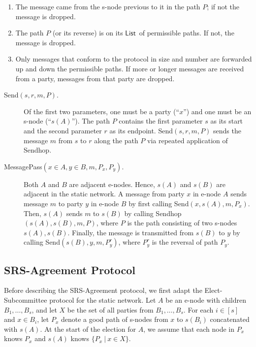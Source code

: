 \documentclass[11pt,letter]{article}
\theoremstyle{mytheoremstyle}
\newcommand{\Sendhop}{\textsf{Sendhop}}
\newcommand{\Send}{\textsf{Send}}
\newcommand{\MessagePass}{\textsf{MessagePass}}
\newcommand{\lst}{\ensuremath{\mathsf{List}}}
\newcommand{\es}{\mbox{\textsf{Elect-Subcommittee}}\xspace}
\newcommand{\rsAlg}{\mbox{\textsf{SRS-Agreement}}\xspace}
\begin{document}
\begin{enumerate}
	\item The message came from the \textsf{s-node} previous to it in the path $P$; if not the message is dropped.
	\item The path $P$ (or its reverse) is on its \lst\ of permissible paths. If not, the message is dropped.	
	\item Only messages that conform to the protocol in size and number are forwarded up and down the permissible paths. If more or longer messages are received from a party, messages from that party are dropped.
\end{enumerate}

\begin{description}
	\item[\Send$(s,r,m,P)$.]
	Of the first two parameters, one must be a party (``$x$'') and one must be an \textsf{s-node} (``$s(A)$''). The path $P$ contains the first parameter $s$ as its start and the second parameter $r$ as its endpoint. \Send$(s,r,m,P)$ sends the message $m$ from $s$ to $r$ along the path $P$ via repeated application of \Sendhop.
	
	\item[\MessagePass$(x\in A, y\in B, m, P_x, P_y)$.]
	Both $A$ and $B$ are adjacent \textsf{e-node}s. Hence, $s(A)$ and $s(B)$ are adjacent in the static network.
	A message from party $x$ in \textsf{e-node} $A$ sends message $m$ to party $y$ in
	\textsf{e-node} $B$ by first calling \Send$(x, s(A),m,P_x)$. Then, $s(A)$ sends $m$ to $s(B)$ by calling \Sendhop$(s(A),s(B),m,P)$, where $P$ is the path consisting of two \textsf{s-node}s $s(A),s(B)$. Finally, the message is transmitted from $s(B)$ to $y$ by calling \Send$(s(B), y, m, P_y^r)$, where $P_y^r$ is the reversal of path $P_y$.
\end{description}

\subsection{\rsAlg Protocol} \label{sec:srs-agreement}

Before describing the \rsAlg protocol, we first adapt the \es protocol for the static network. Let $A$ be an \textsf{e-node} with children $B_1,\ldots,B_s$, and let $X$ be the set of all parties from $B_1,\ldots,B_s$. For each $i\in[s]$ and $x \in B_i$, let $P_x$ denote a good path of \textsf{s-node}s from $x$ to $s(B_i)$ concatenated with $s(A)$. At the start of the election for $A$, we assume that each node in $P_x$ knows $P_x$ and $s(A)$ knows $\{P_x~|~ x \in X\}$. 
\end{document}
